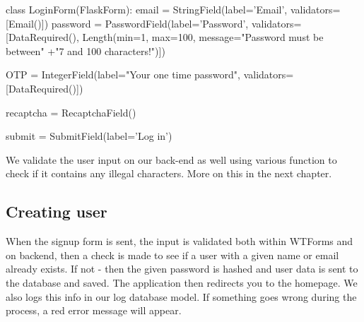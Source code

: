 \begin{python}
class LoginForm(FlaskForm):
   email = StringField(label='Email', validators=[Email()])
   password = PasswordField(label='Password',
                            validators=[DataRequired(),
                            Length(min=1, max=100,
                            message="Password must be between"
                           +"7 and 100 characters!")])
   
   OTP = IntegerField(label="Your one time password",
                      validators=[DataRequired()])

   recaptcha = RecaptchaField()

   submit = SubmitField(label='Log in')
\end{python}

We validate the user input on our back-end as well using various function to check if it contains any illegal characters. More on this in the next chapter.  %

\subsection{Creating user}

When the signup form is sent, the input is validated both within WTForms and on backend, then a check is made to see if a user with a given name or email already exists. If not - then the given password is hashed and user data is sent to the database and saved. The application then redirects you to the homepage. We also logs this info in our log database model. If something goes wrong during the process, a red error message will appear.


